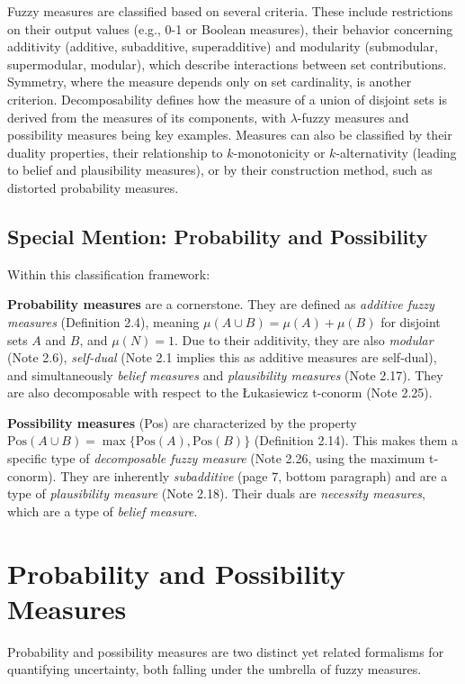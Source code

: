 Fuzzy measures are classified based on several criteria. These include restrictions on their output values (e.g., 0-1 or Boolean measures), their behavior concerning additivity  (additive, subadditive, superadditive) and modularity (submodular, supermodular, modular), which describe interactions between set contributions. Symmetry, where the measure depends only on set cardinality, is another criterion. Decomposability defines how the measure of a union of disjoint sets is derived from the measures of its components, with $\lambda$-fuzzy measures and possibility measures being key examples. Measures can also be classified by their duality properties, their relationship to $k$-monotonicity or $k$-alternativity (leading to belief and plausibility measures), or by their construction method, such as distorted probability measures.

\subsection*{Special Mention: Probability and Possibility}

Within this classification framework:

\textbf{Probability measures} are a cornerstone. They are defined as \textit{additive fuzzy measures} (Definition 2.4), meaning $\mu(A \cup B) = \mu(A) + \mu(B)$ for disjoint sets $A$ and $B$, and $\mu(N)=1$. Due to their additivity, they are also \textit{modular} (Note 2.6), \textit{self-dual} (Note 2.1 implies this as additive measures are self-dual), and simultaneously \textit{belief measures} and \textit{plausibility measures} (Note 2.17). They are also decomposable with respect to the Łukasiewicz t-conorm (Note 2.25).

\textbf{Possibility measures} (Pos) are characterized by the property $\text{Pos}(A \cup B) = \max\{\text{Pos}(A), \text{Pos}(B)\}$ (Definition 2.14). This makes them a specific type of \textit{decomposable fuzzy measure} (Note 2.26, using the maximum t-conorm). They are inherently \textit{subadditive} (page 7, bottom paragraph) and are a type of \textit{plausibility measure} (Note 2.18). Their duals are \textit{necessity measures}, which are a type of \textit{belief measure}.


\section{Probability and Possibility Measures}
Probability and possibility measures are two distinct yet related formalisms for quantifying uncertainty, both falling under the umbrella of fuzzy measures.

